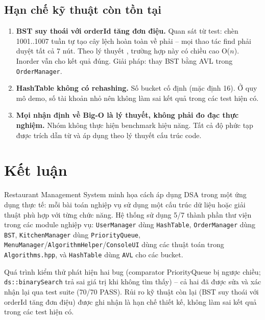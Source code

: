 \documentclass[12pt, a4paper]{article}
\begin{document}
\subsection{Hạn chế kỹ thuật còn tồn tại}

\begin{enumerate}
  \item \textbf{BST suy thoái với orderId tăng đơn điệu.}
        Quan sát từ test: chèn 1001..1007 tuần tự tạo cây lệch hoàn toàn về phải -- mọi
        thao tác find phải duyệt tất cả 7 nút. Theo lý thuyết \cite{clrs}, trường hợp này
        có chiều cao O($n$). Inorder vẫn cho kết quả đúng. Giải pháp: thay BST bằng AVL
        trong \texttt{OrderManager}.

  \item \textbf{HashTable không có rehashing.}
        Số bucket cố định (mặc định 16). Ở quy mô demo, số tài khoản nhỏ nên không làm sai
        kết quả trong các test hiện có.

  \item \textbf{Mọi nhận định về Big-O là lý thuyết, không phải đo đạc thực nghiệm.}
        Nhóm không thực hiện benchmark hiệu năng. Tất cả độ phức tạp được trích dẫn từ
        \cite{clrs} và áp dụng theo lý thuyết cấu trúc code.
\end{enumerate}

\section*{Kết luận}

Restaurant Management System minh họa cách áp dụng DSA trong một ứng dụng thực tế: mỗi bài
toán nghiệp vụ sử dụng một cấu trúc dữ liệu hoặc giải thuật phù hợp với từng chức năng.
Hệ thống sử dụng 5/7 thành phần thư viện trong các module nghiệp vụ: \texttt{UserManager}
dùng \texttt{HashTable}, \texttt{OrderManager} dùng \texttt{BST}, \texttt{KitchenManager}
dùng \texttt{PriorityQueue}, \texttt{MenuManager}/\texttt{AlgorithmHelper}/\texttt{ConsoleUI}
dùng các thuật toán trong \texttt{Algorithms.hpp}, và \texttt{HashTable} dùng \texttt{AVL}
cho các bucket.

Quá trình kiểm thử phát hiện hai bug (comparator PriorityQueue bị ngược chiều;
\texttt{ds::binarySearch} trả sai giá trị khi không tìm thấy) -- cả hai đã được sửa và xác nhận
lại qua test suite (70/70 PASS). Rủi ro kỹ thuật còn lại (BST suy thoái với orderId tăng đơn
điệu) được ghi nhận là hạn chế thiết kế, không làm sai kết quả trong các test hiện có.
\end{document}
